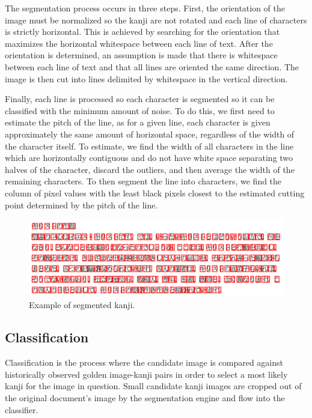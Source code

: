 \documentclass[10pt,twocolumn,letterpaper]{article}
\begin{document}
The segmentation process occurs in three steps. First, the orientation of the image must be normalized so the kanji are not rotated and each line of characters is strictly horizontal. This is achieved by searching for the orientation that maximizes the horizontal whitespace between each line of text.  After the orientation is determined, an assumption is made that there is whitespace between each line of text and that all lines are oriented the same direction. The image is then cut into lines delimited by whitespace in the vertical direction.

Finally, each line is processed so each character is segmented so it can be classified with the minimum amount of noise. To do this, we first need to estimate the pitch of the line, as for a given line, each character is given approximately the same amount of horizontal space, regardless of the width of the character itself. To estimate, we find the width of all characters in the line which are horizontally contiguous and do not have white space separating two halves of the character, discard the outliers, and then average the width of the remaining characters. To then segment the line into characters, we find the column of pixel values with the least black pixels closest to the estimated cutting point determined by the pitch of the line.

\begin{figure}[t]
    \centering
    \includegraphics[width=\columnwidth]{../segmented.png}
    \caption{Example of segmented kanji.}
\end{figure}

\subsection{Classification}
Classification is the process where the candidate image is compared against historically observed golden image-kanji pairs in order to select a most likely kanji for the image in question. Small candidate kanji images are cropped out of the original document’s image by the segmentation engine and flow into the classifier.
\end{document}
